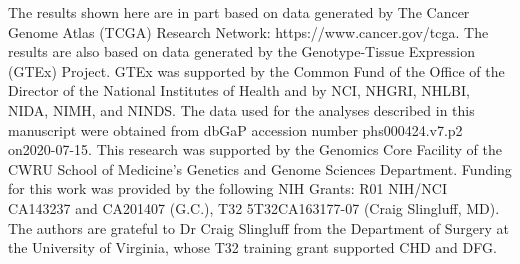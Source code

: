 The results shown here are in part based on data generated by The Cancer Genome Atlas (TCGA) Research Network: https://www.cancer.gov/tcga.
The results are also based on data generated by the Genotype-Tissue Expression (GTEx) Project.
GTEx was supported by the Common Fund of the Office of the Director of the National Institutes of Health and by NCI, NHGRI, NHLBI, NIDA, NIMH, and NINDS.
The data used for the analyses described in this manuscript were obtained from dbGaP accession number phs000424.v7.p2 on2020-07-15.
This research was supported by the Genomics Core Facility of the CWRU School of Medicine's Genetics and Genome Sciences Department.
Funding for this work was provided by the following NIH Grants: R01 NIH/NCI CA143237 and CA201407 (G.C.), T32 5T32CA163177-07 (Craig Slingluff, MD).
The authors are grateful to Dr Craig Slingluff from the Department of Surgery at the University of Virginia, whose T32 training grant supported CHD and DFG.
